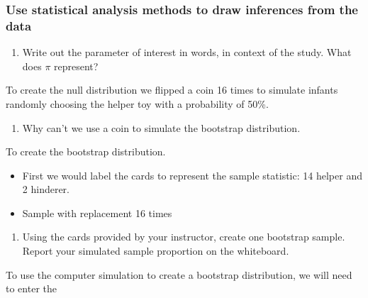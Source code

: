\documentclass[
]{report}
\providecommand{\tightlist}{%
  \setlength{\itemsep}{0pt}\setlength{\parskip}{0pt}}
\begin{document}
\vspace{2in}

\subsubsection*{Use statistical analysis methods to draw inferences from the data}\label{use-statistical-analysis-methods-to-draw-inferences-from-the-data-1}

\begin{enumerate}
\def\labelenumi{\arabic{enumi}.}
\setcounter{enumi}{2}
\tightlist
\item
  Write out the parameter of interest in words, in context of the study. What does \(\pi\) represent?
\end{enumerate}

\vspace{0.5in}

To create the null distribution we flipped a coin 16 times to simulate infants randomly choosing the helper toy with a probability of 50\%.

\begin{enumerate}
\def\labelenumi{\arabic{enumi}.}
\setcounter{enumi}{3}
\tightlist
\item
  Why can't we use a coin to simulate the bootstrap distribution.
\end{enumerate}

\vspace{0.7in}

To create the bootstrap distribution.

\begin{itemize}
\item
  First we would label the cards to represent the sample statistic: 14 helper and 2 hinderer.
\item
  Sample with replacement 16 times
\end{itemize}

\begin{enumerate}
\def\labelenumi{\arabic{enumi}.}
\setcounter{enumi}{4}
\tightlist
\item
  Using the cards provided by your instructor, create one bootstrap sample. Report your simulated sample proportion on the whiteboard.
\end{enumerate}

\vspace{0.3in}

To use the computer simulation to create a bootstrap distribution, we will need to enter the
\end{document}
